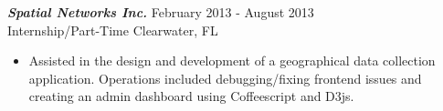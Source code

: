 {\sl \textbf{Spatial Networks Inc.}} \hfill February 2013 - August 2013 \\
Internship/Part-Time \hfill Clearwater, FL
\begin{itemize}
\item Assisted in the design and development of a geographical data collection application. Operations included debugging/fixing frontend issues and creating an admin dashboard using Coffeescript and D3js.
\end{itemize}
